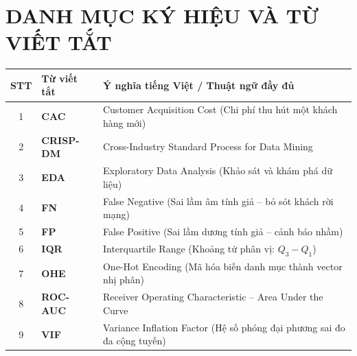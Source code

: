\documentclass[a4paper]{article}
\renewcommand{\arraystretch}{1.25} %
\begin{document}
{
\enlargethispage{2.0cm}
\setlength{\parskip}{0pt}
\linespread{1.02}\selectfont
\tableofcontents
}
\newpage

{
\setlength{\parskip}{2.0pt}
\linespread{1.15}\selectfont
\listoftables
\vspace{1.2cm}
\listoffigures
}
\newpage

\section*{DANH MỤC KÝ HIỆU VÀ TỪ VIẾT TẮT}

\begin{center}
\small
\setlength{\tabcolsep}{6pt}
\renewcommand{\arraystretch}{1.2}
\begin{tabularx}{\textwidth}{| c | >{\raggedright\arraybackslash\bfseries}p{3.5cm} | >{\raggedright\arraybackslash}X |}
\hline
\textbf{STT} & \textbf{Từ viết tắt} & \textbf{Ý nghĩa tiếng Việt / Thuật ngữ đầy đủ} \\
\hline
1 & CAC & Customer Acquisition Cost (Chi phí thu hút một khách hàng mới) \\
\hline
2 & CRISP-DM & Cross-Industry Standard Process for Data Mining \\
\hline
3 & EDA & Exploratory Data Analysis (Khảo sát và khám phá dữ liệu) \\
\hline
4 & FN & False Negative (Sai lầm âm tính giả -- bỏ sót khách rời mạng) \\
\hline
5 & FP & False Positive (Sai lầm dương tính giả -- cảnh báo nhầm) \\
\hline
6 & IQR & Interquartile Range (Khoảng tứ phân vị: $Q_3 - Q_1$) \\
\hline
7 & OHE & One-Hot Encoding (Mã hóa biến danh mục thành vector nhị phân) \\
\hline
8 & ROC-AUC & Receiver Operating Characteristic -- Area Under the Curve \\
\hline
9 & VIF & Variance Inflation Factor (Hệ số phóng đại phương sai đo đa cộng tuyến) \\
\hline
\end{tabularx}
\end{center}
\end{document}
